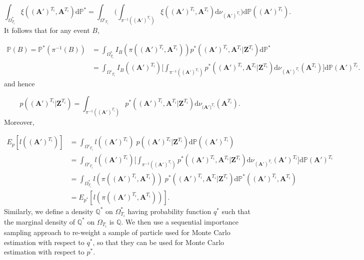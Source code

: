 \documentclass{article}
\newcommand{\D}{\mathrm{d}}
\renewcommand{\vec}[1]{\mathbf{#1}}
\begin{document}
\begin{equation*}
    \int_{\Omega^*_{T_i}} \xi((\vec{A}')^{T_i}, \vec{A}^{T_i}) \D \mathbb{P}^* = \int_{\Omega'_{T_i}} \Bigg( \int_{\pi^{-1}((\vec{A}')^{T_i})} \xi((\vec{A}')^{T_i}, \vec{A}^{T_i}) \D \nu_{(\vec{A}')^{T_i}}  \Bigg) \D \mathbb{P}((\vec{A}')^{T_i}).
\end{equation*}
It follows that for any event $B$,

\begin{align*}
    \mathbb{P}(B) = \mathbb{P}^*(\pi^{-1}(B)) &= \int_{\Omega^*_{T_i}} I_B (\pi((\vec{A}')^{T_i}, \vec{A}^{T_i})) p^* ((\vec{A}')^{T_i}, \vec{A}^{T_i} | \vec{Z}^{T_i}) \D \mathbb{P}^* \\ 
    &= \int_{\Omega'_{T_i}} I_B ((\vec{A}')^{T_i}) \Bigg[ \int_{\pi^{-1}((\vec{A}')^{T_i})} p^* ((\vec{A}')^{T_i}, \vec{A}^{T_i} | \vec{Z}^{T_i}) \D \nu_{(\vec{A}')^{T_i}} (\vec{A}^{T_i}) \Bigg] \D \mathbb{P} (\vec{A}')^{T_i}.
\end{align*}
and hence

\begin{equation*}
    p((\vec{A}')^{T_i} | \vec{Z}^{T_i}) = \int_{\pi^{-1}((\vec{A}')^{T_i})} p^*((\vec{A}')^{T_i}, \vec{\vec{A}}^{T_i} | \vec{Z}^{T_i})\D \nu_{(\vec{A')}^{T_i}} (\vec{A}^{T_i}).
\end{equation*}
Moreover,

\begin{align*}
    E_{p}[l(\vec{(A')}^{T_i})]  &= \int_{\Omega'_{T_i}} l(\vec{(A')}^{T_i})\; p(\vec{(A')}^{T_i} | \vec{Z}^{T_i}) \D \mathbb{P}(\vec{(A')}^{T_i}) \\
    &= \int_{\Omega'_{T_i}} l(\vec{(A')}^{T_i})\Bigg[\int_{\pi^{-1}((\vec{A}')^{T_i})} p^*(\vec{(A')}^{T_i}, \vec{A}^{T_i} | \vec{Z}^{T_i}) \D \nu_{(\vec{A}')^{T_i}}(\vec{A}')^{T_i} \Bigg] \D \mathbb{P}{(\vec{A}')}^{T_i} \\ 
    &= \int_{\Omega^*_{T_i}} l(\pi(\vec{(A')}^{T_i}, \vec{A}^{T_i}))\; p^*(\vec{(A')}^{T_i}, \vec{A}^{T_i} | \vec{Z}^{T_i}) \D \mathbb{P}^*((\vec{A}')^{T_i}, \vec{A}^{T_i}) \\ 
    &= E_{p^*}[l(\pi (\vec{(A')}^{T_i}, \vec{A}^{T_i}))].
\end{align*}
Similarly, we define a density $\mathbb{Q}^*$ on $\Omega^*_{T_i}$ having probability function $q^*$ such that the marginal density of $\mathbb{Q}^*$ on $\Omega_{T_i}$ is $\mathbb{Q}$. We then use a sequential importance sampling approach to re-weight a sample of particle used for Monte Carlo estimation with respect to $q^*$, so that they can be used for Monte Carlo estimation with respect to $p^*$.
\end{document}

